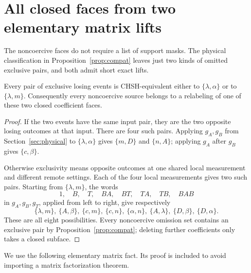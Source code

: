 \section{All closed faces from two elementary matrix lifts}
\label{sec:closed-faces-short}

The noncoercive faces do not require a list of support masks. The
physical classification in Proposition~\ref{prop:compat} leaves just
two kinds of omitted exclusive pairs, and both admit short exact lifts.

\begin{lemma}
\label{lem:closed-face-orbits}
Every pair of exclusive losing events is CHSH-equivalent either to
$\{\lambda,\alpha\}$ or to $\{\lambda,m\}$. Consequently every
noncoercive source belongs to a relabeling of one of these two closed
coefficient faces.
\end{lemma}
\begin{proof}
If the two events have the same input pair, they are the two opposite
losing outcomes at that input. There are four such pairs. Applying
$g_A,g_B$ from Section~\ref{sec:physical} to
$\{\lambda,\alpha\}$ gives $\{m,D\}$ and $\{n,A\}$; applying
$g_A$ after $g_B$ gives $\{c,\beta\}$.

Otherwise exclusivity means opposite outcomes at one shared local
measurement and different remote settings. Each of the four local
measurements gives two such pairs. Starting from $\{\lambda,m\}$,
the words
\[
 1,\quad B,\quad T,\quad BA,\quad BT,\quad TA,\quad TB,\quad BAB
\]
in $g_A,g_B,g_T$, applied from left to right, give respectively
\[
 \{\lambda,m\},\ \{A,\beta\},\ \{c,m\},\ \{c,n\},\
 \{\alpha,n\},\ \{A,\lambda\},\ \{D,\beta\},\ \{D,\alpha\}.
\]
These are all eight possibilities. Every noncoercive omission set
contains an exclusive pair by Proposition~\ref{prop:compat}; deleting
further coefficients only takes a closed subface.
\end{proof}

We use the following elementary matrix fact. Its proof is included to
avoid importing a matrix factorization theorem.

